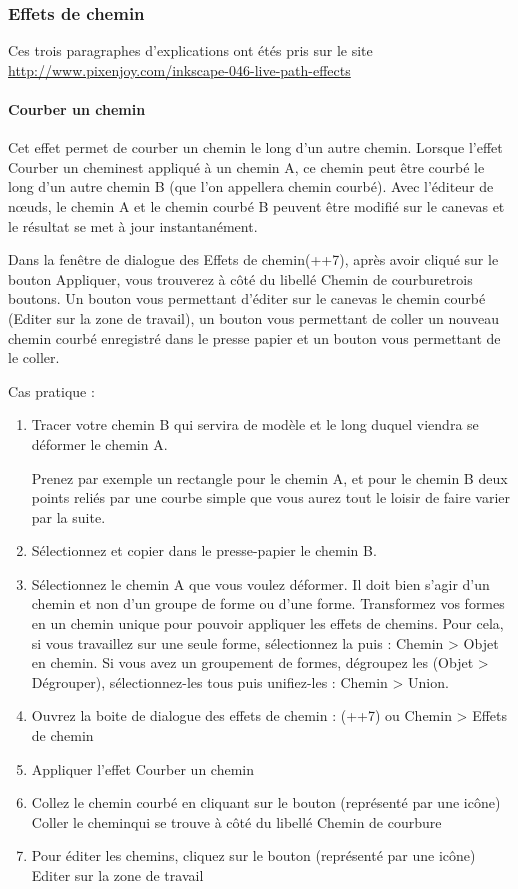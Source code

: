 \documentclass[a4paper,twoside]{article}
\begin{document}
\subsubsection{Effets de chemin}
Ces trois paragraphes d'explications ont étés pris sur le site \\
\url{http://www.pixenjoy.com/inkscape-046-live-path-effects}
\paragraph{Courber un chemin}

Cet effet permet de courber un chemin le long d'un autre chemin. Lorsque l'effet \og Courber un chemin\fg  est appliqué à un chemin A, ce chemin peut être courbé le long d'un autre chemin B (que l'on appellera \og chemin courbé\fg ). Avec l'éditeur de n\oe uds, le chemin A et le chemin courbé B peuvent être modifié sur le canevas et le résultat se met à jour instantanément.

Dans la fenêtre de dialogue des \og Effets de chemin\fg  (++7), après avoir cliqué sur le bouton \og Appliquer\fg , vous trouverez à côté du libellé \og Chemin de courbure\fg  trois boutons. Un bouton vous permettant d'éditer sur le canevas le chemin courbé (Editer sur la zone de travail), un bouton vous permettant de coller un nouveau chemin courbé enregistré dans le presse papier et un bouton vous permettant de le coller.

Cas pratique :
\begin{enumerate}
\item Tracer votre chemin B qui servira de modèle et le long duquel viendra se déformer le chemin A.
\begin{exemple}
Prenez par exemple un rectangle pour le chemin A, et pour le chemin B deux points reliés par une courbe simple que vous aurez tout le loisir de faire varier par la suite.
\end{exemple}
\item Sélectionnez et copier dans le presse-papier le chemin B.
\item Sélectionnez le chemin A que vous voulez déformer. Il doit bien s'agir d'un chemin et non d'un groupe de forme ou d'une forme. Transformez vos formes en un chemin unique pour pouvoir appliquer les \og effets de chemins\fg . Pour cela, si vous travaillez sur une seule forme, sélectionnez la puis : Chemin > Objet en chemin. Si vous avez un groupement de formes, dégroupez les (Objet > Dégrouper), sélectionnez-les tous puis unifiez-les : Chemin > Union.
\item Ouvrez la boite de dialogue des effets de chemin : (++7) ou Chemin > Effets de chemin
\item Appliquer l'effet \og Courber un chemin\fg
\item Collez le chemin courbé en cliquant sur le bouton (représenté par une icône) \og Coller le chemin\fg  qui se trouve à côté du libellé \og Chemin de courbure\fg
\item Pour éditer les chemins, cliquez sur le bouton (représenté par une icône) \og Editer sur la zone de travail\fg
\end{enumerate}
\end{document}
